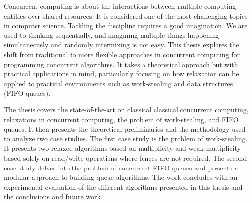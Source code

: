 \begin{resumen}

Concurrent computing is about the interactions between multiple computing entities over shared resources. It is considered one of the most challenging topics in computer science. Tackling the discipline requires a good imagination. We are used to thinking sequentially, and imagining multiple things happening simultaneously and randomly intermixing is not easy. This thesis explores the shift from traditional to more flexible approaches in concurrent computing for programming concurrent algorithms. It takes a theoretical approach but with practical applications in mind, particularly focusing on how relaxation can be applied to practical environments such as work-stealing and data structures (FIFO queues).

The thesis covers the state-of-the-art on classical classical concurrent computing, relaxations in concurrent computing, the problem of work-stealing, and FIFO queues. It then presents the theoretical preliminaries and the methodology used to analyze two case studies. The first case study is the problem of work-stealing. It presents two relaxed algorithms based on multiplicity and weak multiplicity based solely on read/write operations where fences are not required. The second case study delves into the problem of concurrent FIFO queues and presents a modular approach to building queue algorithms. The work concludes with an experimental evaluation of the different algorithms presented in this thesis and the conclusions and future work.


\end{resumen}
